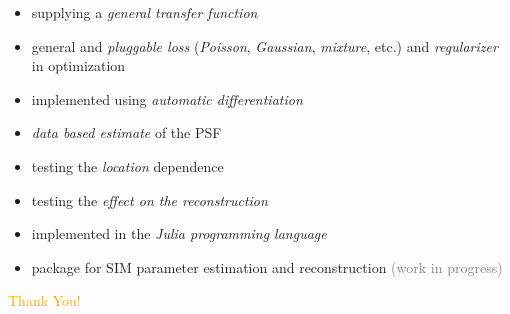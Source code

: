 \begin{frame}
    \begin{description}
        \pause \item[reconstruction]\leavevmode
            \begin{itemize}
                \item supplying a \emph{general transfer function}
                \item general and \emph{pluggable loss} (\emph{Poisson}, \emph{Gaussian}, \emph{mixture}, etc.) and
                    \emph{regularizer} in optimization
                \item implemented using \emph{automatic differentiation}
            \end{itemize}
            \pause \item[transfer function]\leavevmode
            \begin{itemize}
                \item \emph{data based estimate} of the \acs{PSF}
                \item testing the \emph{location} dependence
                \item testing the \emph{effect on the reconstruction}
            \end{itemize} 
        \pause \item[general]\leavevmode
            \begin{itemize}
                \item implemented in the \emph{Julia programming language} 
                \item package for \ac{SIM} parameter estimation and reconstruction \textcolor{gray}{(work in progress)}
            \end{itemize}
    \end{description}
\end{frame}

\begin{frame}
    \vfill
    \begin{center}
        \huge{\textcolor{Orange}{Thank You!}}
    \end{center}
    \vfill
\end{frame}


